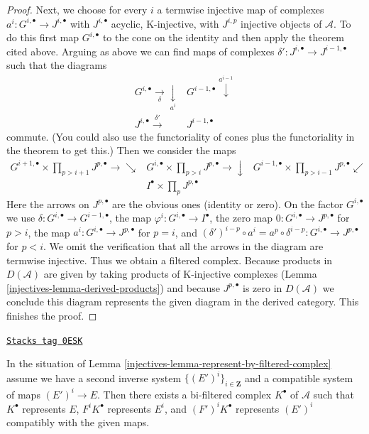 \begin{proof}
\medskip\noindent
Next, we choose for every $i$ a termwise injective map of complexes
$a^i : G^{i, \bullet} \to J^{i, \bullet}$ with $J^{i, \bullet}$
acyclic, K-injective, with $J^{i, p}$ injective objects of $\mathcal{A}$.
To do this first map $G^{i, \bullet}$ to the cone on the identity
and then apply the theorem cited above.
Arguing as above we can find maps of complexes
$\delta' : J^{i, \bullet} \to J^{i - 1, \bullet}$ such that the diagrams
$$
\begin{array}{cc}G^{i, \bullet} \underset{\delta}{\longrightarrow}\underset{a^i}{\downarrow} & G^{i - 1, \bullet} \overset{a^{i - 1}}{\downarrow} \\ J^{i, \bullet} \overset{\delta'}{\longrightarrow} & J^{i - 1, \bullet}\end{array}
$$
commute. (You could also use the functoriality of cones plus the
functoriality in the theorem to get this.)
Then we consider the maps
$$
\begin{array}{ccc}G^{i + 1, \bullet} \times \prod\nolimits_{p > i + 1} J^{p, \bullet}
\longrightarrow\searrow & G^{i, \bullet} \times \prod\nolimits_{p > i} J^{p, \bullet}
\longrightarrow\downarrow & G^{i - 1, \bullet} \times \prod\nolimits_{p > i - 1} J^{p, \bullet}
\swarrow \\  & I^\bullet \times \prod\nolimits_p J^{p, \bullet} & \end{array}
$$
Here the arrows on $J^{p, \bullet}$ are the obvious ones
(identity or zero). On the factor $G^{i, \bullet}$ we use
$\delta : G^{i, \bullet} \to G^{i - 1, \bullet}$, the map
$\varphi^i : G^{i, \bullet} \to I^\bullet$, the zero map
$0 : G^{i, \bullet} \to J^{p, \bullet}$ for $p > i$, the map
$a^i : G^{i, \bullet} \to J^{p, \bullet}$ for $p = i$, and
$(\delta')^{i - p} \circ a^i = a^p \circ \delta^{i - p} :
G^{i, \bullet} \to J^{p, \bullet}$ for $p < i$.
We omit the verification that all the arrows
in the diagram are termwise injective. Thus we obtain a filtered
complex. Because products in $D(\mathcal{A})$ are given by
taking products of K-injective complexes
(Lemma \ref{injectives-lemma-derived-products})
and because $J^{p, \bullet}$ is zero in $D(\mathcal{A})$
we conclude this diagram represents the given diagram in the derived
category. This finishes the proof.
\end{proof}

\begin{lemma}
\label{injectives-lemma-represent-by-filtered-complex-bis}
\href{https://stacks.math.columbia.edu/tag/0ESK}{\texttt{Stacks tag 0ESK}}

In the situation of Lemma \ref{injectives-lemma-represent-by-filtered-complex}
assume we have a second inverse system $\{(E')^i\}_{i \in \mathbf{Z}}$
and a compatible system of maps $(E')^i \to E$.
Then there exists a bi-filtered complex $K^\bullet$ of $\mathcal{A}$
such that $K^\bullet$ represents $E$, $F^iK^\bullet$ represents $E^i$,
and $(F')^iK^\bullet$ represents $(E')^i$ compatibly with the given maps.
\end{lemma}

